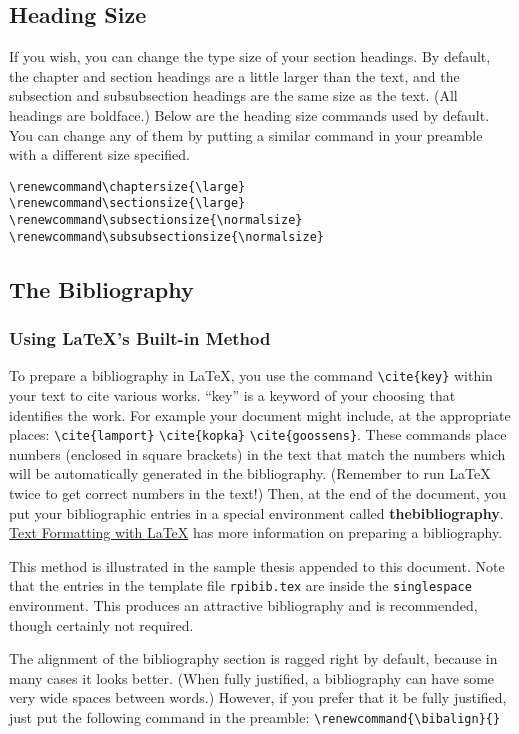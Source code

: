 \documentclass[letterpaper,11pt]{article}
\begin{document}
\subsection{Heading Size}

If you wish, you can change the type size of your section headings. By default, the chapter
and section headings are a little larger than the text, and the subsection and subsubsection
headings are the same size as the text. (All headings are boldface.) Below are the heading
size commands used by default. You can change any of them by putting a similar command
in your preamble with a different size specified.
\begin{verbatim}
\renewcommand\chaptersize{\large}
\renewcommand\sectionsize{\large}
\renewcommand\subsectionsize{\normalsize}
\renewcommand\subsubsectionsize{\normalsize}
\end{verbatim}

\subsection{The Bibliography}

\subsubsection{Using {\LaTeX}'s Built-in Method}


To prepare a bibliography in {\LaTeX}, you use the command \verb|\cite{key}|
within your text to cite various works. ``key'' is a keyword of your
choosing that identifies the work. For example your document might
include, at the appropriate places: \verb|\cite{lamport}| \verb|\cite{kopka}|
\verb|\cite{goossens}|. These commands place numbers (enclosed in square
brackets) in the text that match the numbers which will be
automatically generated in the bibliography. (Remember to run {\LaTeX}
twice to get correct numbers in the text!) Then, at the end of the
document, you put your bibliographic entries in a special environment
called \textbf{thebibliography}.
\href{http://www.rpi.edu/dept/arc/docs/latex/latex-intro.pdf}{Text Formatting with {\LaTeX}}
has more
information on preparing a bibliography.

This method is illustrated
in the sample thesis appended to this document. Note that the entries
in the template file \texttt{rpibib.tex} are inside the \texttt{singlespace}
environment. This produces an attractive bibliography and is
recommended, though certainly not required.

The alignment of the
bibliography section is ragged right by default, because in many cases
it looks better. (When fully justified, a bibliography can have some
very wide spaces between words.) However, if you prefer that it be
fully justified, just put the following command in the preamble:
\verb|\renewcommand{\bibalign}{}|
\end{document}
